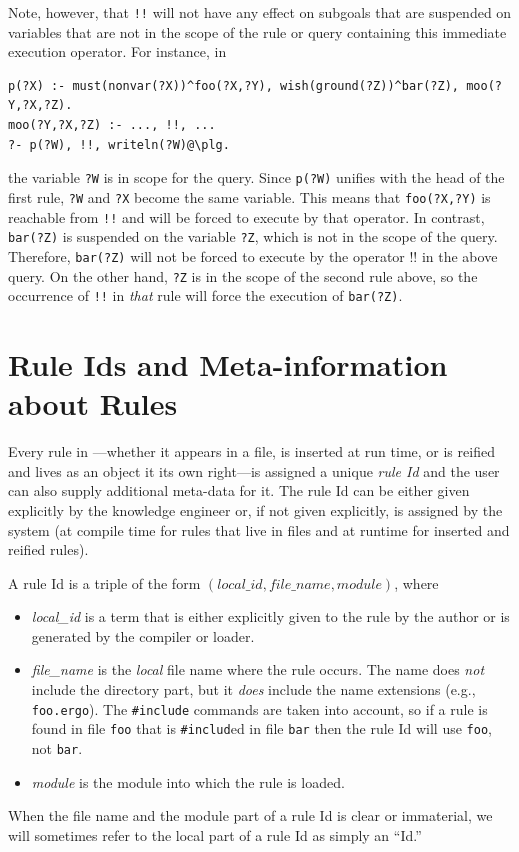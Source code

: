 \documentclass[11pt]{article}
\newcommand{\ERGO}{\mbox{\smaller{\ensuremath{\cal{E}}\smaller{{\sc{RGO}}}}}\xspace}
\newcommand{\FLSYSTEM}{\ERGO}
\newcommand{\ergoext}{ergo\xspace}
\begin{document}
Note, however, that \texttt{!!} will not have any effect on subgoals that
are suspended on variables that are not in the scope of the rule or query
containing this
immediate execution operator. For instance, in
\begin{verbatim}
p(?X) :- must(nonvar(?X))^foo(?X,?Y), wish(ground(?Z))^bar(?Z), moo(?Y,?X,?Z).
moo(?Y,?X,?Z) :- ..., !!, ...
?- p(?W), !!, writeln(?W)@\plg.
\end{verbatim}
the variable \texttt{?W} is in scope for the query. Since
\texttt{p(?W)} unifies with the head of the first rule, \texttt{?W} and
\texttt{?X} become the same variable. This means that \texttt{foo(?X,?Y)}
is reachable from \texttt{!!} and will be forced to execute by that operator.
In contrast, \texttt{bar(?Z)} is suspended on the variable \texttt{?Z},
which is not in the scope of the query. Therefore, \texttt{bar(?Z)} will
not be forced to execute by the operator !! in the above query.   
On the other hand, \texttt{?Z} is in the scope of the second rule above, so
the occurrence of \texttt{!!} in \emph{that} rule will force the execution of
\texttt{bar(?Z)}.   


\section{Rule Ids and Meta-information about Rules}
\label{sec-rule-id}

Every rule in \FLSYSTEM---whether it appears in a file, is inserted at run
time, or is reified and lives as an object it its own right---is assigned a
unique \emph{rule Id} and the user can also supply additional
meta-data for it. The rule Id can be either given explicitly by the
knowledge engineer or, if not given explicitly, is assigned by the system (at compile time for
rules that live in files and at runtime for inserted and reified rules).

\noindent
A rule Id is a triple of the form
$(local\_id,file\_name,module)$, where
\begin{itemize}
\item \emph{local\_id} is a term that is either explicitly given to the rule
  by the author or is generated by the compiler or loader.
\item \emph{file\_name} is the \emph{local}
  file name where the rule occurs. The name
  does \emph{not} include the directory part, but it \emph{does}
  include the name
  extensions (e.g., \texttt{foo.\ergoext}). The \texttt{\#include} commands are
  taken into account, so if a rule is found in file \texttt{foo} that is
  \texttt{\#includ}ed in file \texttt{bar} then the rule Id will use
  \texttt{foo}, not \texttt{bar}.
\item \emph{module} is the module into which the rule is loaded. 
\end{itemize}
When the file name and the module part of a rule Id is clear or immaterial,
we will sometimes refer to the local part of a rule Id as simply an ``Id.''
\end{document}
